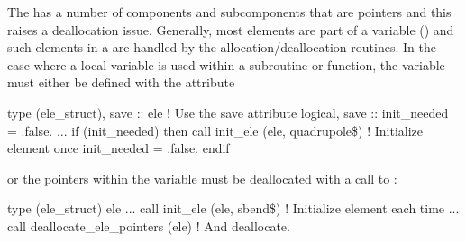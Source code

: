 The  has a number of components and subcomponents 
that are pointers and this raises a deallocation issue.
Generally, most  elements are part of a 
variable ()
and such elements in a  are handled by the
 allocation/deallocation routines. 
In the case where a local 
variable is used within a subroutine or function, the  
variable must either be defined with the  attribute 
\begin{example}
  type (ele_struct), save :: ele          ! Use the save attribute
  logical, save :: init_needed = .false.
  ...
  if (init_needed) then
    call init_ele (ele, quadrupole\$)     ! Initialize element once
    init_needed = .false.
  endif
\end{example}
or the pointers within the variable must be deallocated  with a call to
:
\begin{example}
  type (ele_struct) ele  
  ...
  call init_ele (ele, sbend\$)            ! Initialize element each time
  ...
  call deallocate_ele_pointers (ele) ! And deallocate.
\end{example}

